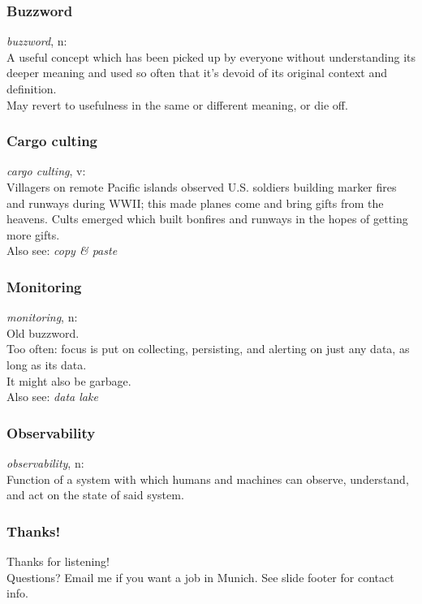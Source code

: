 \documentclass[t]{beamer}
\begin{document}
\begin{frame}
	\frametitle{Buzzword}
	\begin{center}
		\vfill
		\textit{buzzword}, n:\\
		A useful concept which has been picked up by everyone without understanding its deeper meaning and used so often that it's devoid of its original context and definition.\\
		May revert to usefulness in the same or different meaning, or die off.
		\vfill
	\end{center}
\end{frame}

\begin{frame}
	\frametitle{Cargo culting}
	\begin{center}
		\vfill
		\textit{cargo culting}, v:\\
		Villagers on remote Pacific islands observed U.S. soldiers building marker fires and runways during WWII; this made planes come and bring gifts from the heavens.
		Cults emerged which built bonfires and runways in the hopes of getting more gifts.\\
		Also see: \textit{copy \& paste}
		\vfill
	\end{center}
\end{frame}

\begin{frame}
	\frametitle{Monitoring}
	\begin{center}
		\vfill
		\textit{monitoring}, n:\\
		Old buzzword.\\
		Too often: focus is put on collecting, persisting, and alerting on just any data, as long as its data.\\
		It might also be garbage.\\
		Also see: \textit{data lake}
		\vfill
	\end{center}
\end{frame}

\begin{frame}
	\frametitle{Observability}
	\begin{center}
		\vfill
		\textit{observability}, n:\\
		Function of a system with which humans and machines can observe, understand, and act on the state of said system.
		\vfill
	\end{center}
\end{frame}

\begin{frame}
	\frametitle{Thanks!}
	\begin{center}
		\vfill
		Thanks for listening!\\
		\vfill
		Questions?
		\vfill
		Email me if you want a job in Munich.
		\vfill
		See slide footer for contact info.
		\vfill
	\end{center}
\end{frame}
\end{document}
